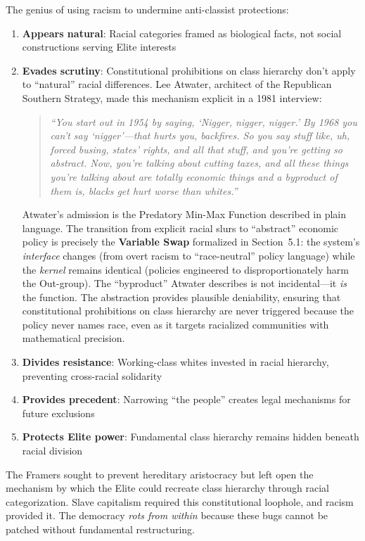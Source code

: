 \documentclass[12pt,openany]{book}
\begin{document}
The genius of using racism to undermine anti-classist protections:
\begin{enumerate}
    \item \textbf{Appears natural}: Racial categories framed as biological facts, not social constructions serving Elite interests
    \item \textbf{Evades scrutiny}: Constitutional prohibitions on class hierarchy don't apply to ``natural'' racial differences. Lee Atwater, architect of the Republican Southern Strategy, made this mechanism explicit in a 1981 interview:

    \begin{quote}
    \textit{``You start out in 1954 by saying, `Nigger, nigger, nigger.' By 1968 you can't say `nigger'---that hurts you, backfires. So you say stuff like, uh, forced busing, states' rights, and all that stuff, and you're getting so abstract. Now, you're talking about cutting taxes, and all these things you're talking about are totally economic things and a byproduct of them is, blacks get hurt worse than whites.''} \cite{atwater}
    \end{quote}

    Atwater's admission is the Predatory Min-Max Function described in plain language. The transition from explicit racial slurs to ``abstract'' economic policy is precisely the \textbf{Variable Swap} formalized in Section~5.1: the system's \textit{interface} changes (from overt racism to ``race-neutral'' policy language) while the \textit{kernel} remains identical (policies engineered to disproportionately harm the Out-group). The ``byproduct'' Atwater describes is not incidental---it \textit{is} the function. The abstraction provides plausible deniability, ensuring that constitutional prohibitions on class hierarchy are never triggered because the policy never names race, even as it targets racialized communities with mathematical precision.
    \item \textbf{Divides resistance}: Working-class whites invested in racial hierarchy, preventing cross-racial solidarity
    \item \textbf{Provides precedent}: Narrowing ``the people'' creates legal mechanisms for future exclusions
    \item \textbf{Protects Elite power}: Fundamental class hierarchy remains hidden beneath racial division
\end{enumerate}

The Framers sought to prevent hereditary aristocracy but left open the mechanism by which the Elite could recreate class hierarchy through racial categorization. Slave capitalism required this constitutional loophole, and racism provided it. The democracy \textit{rots from within} because these bugs cannot be patched without fundamental restructuring.
\end{document}
